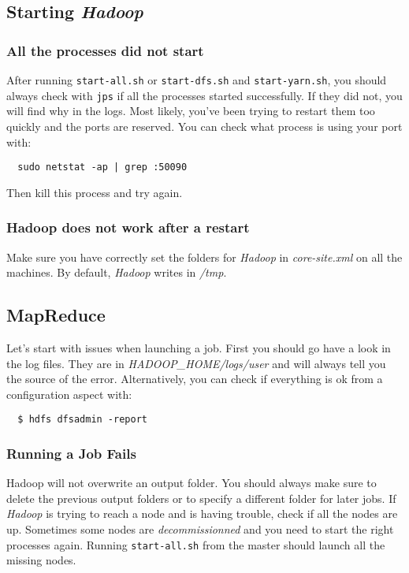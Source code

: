 \documentclass[a4paper, 12pt]{article}
\begin{document}
  \subsection{Starting \textit{Hadoop}}

    \subsubsection*{All the processes did not start}
    
After running \texttt{start-all.sh} or \texttt{start-dfs.sh} and \texttt{start-yarn.sh}, you should always check with \texttt{jps} if all the processes started successfully. If they did not, you will find why in the logs. Most likely, you've been trying to restart them too quickly and the ports are reserved. You can check what process is using your port with:

\begin{verbatim}
  sudo netstat -ap | grep :50090
\end{verbatim}

Then kill this process and try again.

    \subsubsection*{Hadoop does not work after a restart}
    
Make sure you have correctly set the folders for \textit{Hadoop} in \textit{core-site.xml} on all the machines. By default, \textit{Hadoop} writes in \textit{/tmp}.

  \subsection{MapReduce}

Let's start with issues when launching a job. First you should go have a look in the log files. They are in \textit{HADOOP\_HOME/logs/user} and will always tell you the source of the error. Alternatively, you can check if everything is ok from a configuration aspect with:

\begin{verbatim}
  $ hdfs dfsadmin -report
\end{verbatim}
  
    \subsubsection*{Running a Job Fails}

Hadoop will not overwrite an output folder. You should always make sure to delete the previous output folders or to specify a different folder for later jobs. If \textit{Hadoop} is trying to reach a node and is having trouble, check if all the nodes are up. Sometimes some nodes are \textit{decommissionned} and you need to start the right processes again. Running \texttt{start-all.sh} from the master should launch all the missing nodes.
\end{document}
